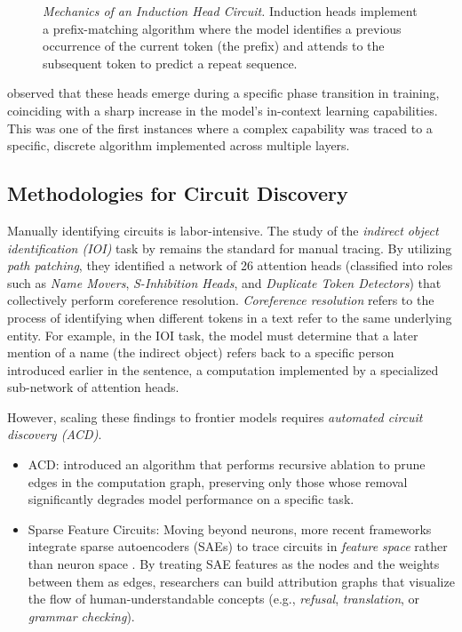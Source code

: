 \begin{figure}[htbp]
    \centering
    \resizebox{1.0\textwidth}{!}{
        
    }
    \caption{\emph{Mechanics of an Induction Head Circuit.} Induction heads implement a prefix-matching algorithm where the model identifies a previous occurrence of the current token (the prefix) and attends to the subsequent token to predict a repeat sequence.
    \label{fig:induction_head} }
\end{figure}

\citet{olsson2022context} observed that these heads emerge during a specific phase transition in training, coinciding with a sharp increase in the model's in-context learning capabilities. This was one of the first instances where a complex capability was traced to a specific, discrete algorithm implemented across multiple layers.

\subsection{Methodologies for Circuit Discovery}
Manually identifying circuits is labor-intensive. The study of the \emph{indirect object identification (IOI)} task by \citet{wang2022interpretability} remains the standard for manual tracing. By utilizing \emph{path patching}, they identified a network of 26 attention heads (classified into roles such as {\em Name Movers}, {\em S-Inhibition Heads}, and {\em Duplicate Token Detectors}) that collectively perform coreference resolution. \emph{Coreference resolution} refers to the process of identifying when different tokens  in a text refer to the same underlying entity. For example, in the IOI task, the model must determine that a later mention of a name (the indirect object) refers back to a specific person introduced earlier in the sentence, a computation implemented by a specialized sub-network of attention heads.

However, scaling these findings to frontier models requires \emph{automated circuit discovery (ACD)}.
\begin{itemize}
    \item ACD: \citet{conmy2023towards} introduced an algorithm that performs recursive ablation to prune edges in the computation graph, preserving only those whose removal significantly degrades model performance on a specific task.
    \item Sparse Feature Circuits: Moving beyond neurons, more recent frameworks integrate sparse autoencoders (SAEs) to trace circuits in \emph{feature space} rather than neuron space \citep{marks2024sparse}. By treating SAE features as the nodes and the weights between them as edges, researchers can build attribution graphs that visualize the flow of human-understandable concepts (e.g., \emph{refusal}, \emph{translation}, or \emph{grammar checking}).
\end{itemize}



